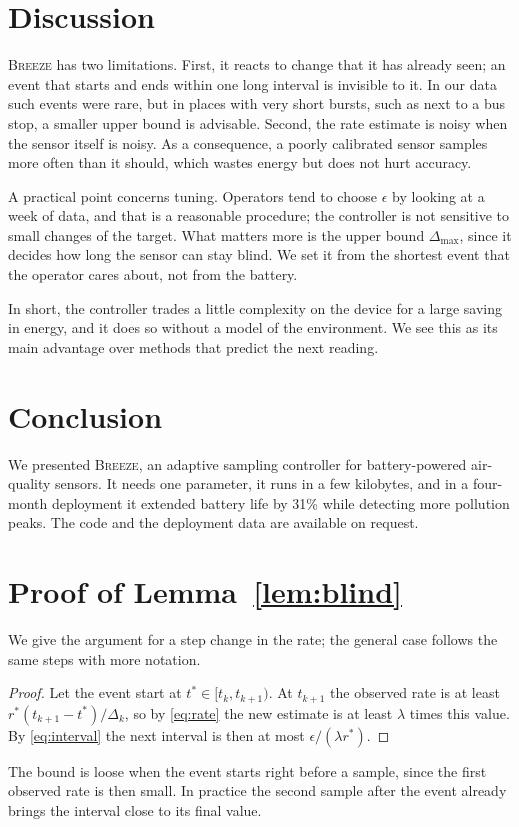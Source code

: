 \documentclass{article}
\newcommand{\sys}{\textsc{Breeze}\xspace}
\begin{document}
\section{Discussion}

\sys has two limitations. First, it reacts to change that it has already
seen; an event that starts and ends within one long interval is invisible to
it. In our data such events were rare, but in places with very short bursts,
such as next to a bus stop, a smaller upper bound is advisable. Second, the
rate estimate is noisy when the sensor itself is noisy. As a consequence, a
poorly calibrated sensor samples more often than it should, which wastes
energy but does not hurt accuracy.

A practical point concerns tuning. Operators tend to choose $\epsilon$ by
looking at a week of data, and that is a reasonable procedure; the
controller is not sensitive to small changes of the target. What matters
more is the upper bound $\Delta_{\max}$, since it decides how long the
sensor can stay blind. We set it from the shortest event that the operator
cares about, not from the battery.

In short, the controller trades a little complexity on the device for a
large saving in energy, and it does so without a model of the environment.
We see this as its main advantage over methods that predict the next
reading.

\section{Conclusion}

We presented \sys, an adaptive sampling controller for battery-powered
air-quality sensors. It needs one parameter, it runs in a few kilobytes, and
in a four-month deployment it extended battery life by 31\% while detecting
more pollution peaks. The code and the deployment data are available on
request.




\appendix
\section{Proof of Lemma~\ref{lem:blind}}\label{app:proof}

We give the argument for a step change in the rate; the general case follows
the same steps with more notation.

\begin{proof}
  Let the event start at $t^\ast \in [t_k, t_{k+1})$. At $t_{k+1}$ the observed rate is at least
  $r^\ast (t_{k+1} - t^\ast) / \Delta_k$, so by \eqref{eq:rate} the new estimate is at least $\lambda$ times
  this value. By \eqref{eq:interval} the next interval is then at most $\epsilon / (\lambda r^\ast)$.
\end{proof}

The bound is loose when the event starts right before a sample, since the
first observed rate is then small. In practice the second sample after the
event already brings the interval close to its final value.
\end{document}

